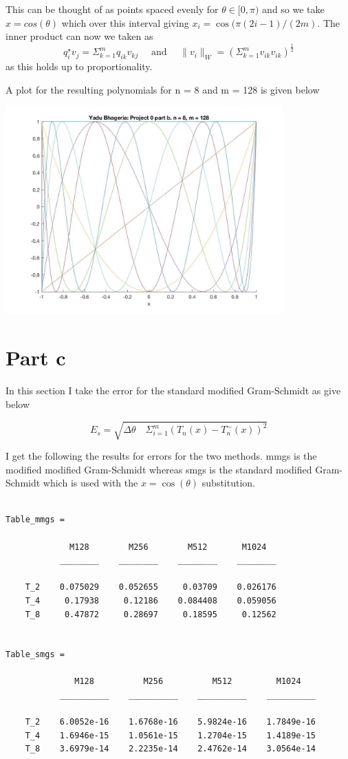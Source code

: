 \documentclass[a4paper,10pt]{article}
\begin{document}
 This can be thought of as points spaced evenly for $\theta \in [0,\pi)$ and so we take $x = cos(\theta)$ which over this interval giving $x_i = \cos(\pi(2i − 1)/(2m)$. The inner product can now we taken as $$ q_i^\star v_j = \Sigma_{k=1}^m q_{ik} v_{kj} \quad \text{ and } \quad \|v_i\|_W = (\Sigma_{k=1}^m v_{ik} v_{ik})^{\frac{1}{2}} $$ as this holds up to proportionality.

A plot for the resulting polynomials for n = 8 and m = 128 is given below

\begin{center}
	\includegraphics[width=0.8\textwidth]{fig_b.jpg}
\end{center}

\section{Part c}

In this section I take the error for the standard modified Gram-Schmidt as give below

$$
	E_s = \sqrt{ \Delta \theta \quad \Sigma_{i=1}^m ( T_n(x) - T^\sim_n(x))^2}
$$

I get the following the results for errors for the two methods. mmgs is the modified modified Gram-Schmidt whereas smgs is the standard modified Gram-Schmidt which is used with the $x=\cos(\theta)$ substitution.

\begin{verbatim}

Table_mmgs = 

             M128        M256        M512       M1024  
           ________    ________    ________    ________

    T_2    0.075029    0.052655     0.03709    0.026176
    T_4     0.17938     0.12186    0.084408    0.059056
    T_8     0.47872     0.28697     0.18595     0.12562


Table_smgs = 

              M128          M256          M512         M1024   
           __________    __________    __________    __________

    T_2    6.0052e-16    1.6768e-16    5.9824e-16    1.7849e-16
    T_4    1.6946e-15    1.0561e-15    1.2704e-15    1.4189e-15
    T_8    3.6979e-14    2.2235e-14    2.4762e-14    3.0564e-14
\end{verbatim}
\end{document}
